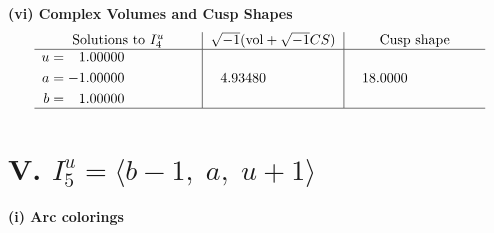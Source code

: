 \documentclass[1p]{elsarticle_modified}
\theoremstyle{definition}
\newcommand{\I}{\sqrt{-1}}
\begin{document}
\newpage\flushleft \textbf{(vi) Complex Volumes and Cusp Shapes}
$$\begin{array}{c|c|c}  
\text{Solutions to }I^u_{4}& \I (\text{vol} + \sqrt{-1}CS) & \text{Cusp shape}\\
 \hline 
\begin{aligned}
u &= \phantom{-}1.00000\phantom{ +0.000000I} \\
a &= -1.00000\phantom{ +0.000000I} \\
b &= \phantom{-}1.00000\phantom{ +0.000000I}\end{aligned}
 & \phantom{-}4.93480\phantom{ +0.000000I} & \phantom{-}18.0000\phantom{ +0.000000I}\\
 \hline 
 \end{array}$$\newpage\newpage\renewcommand{\arraystretch}{1}
\centering \section*{V. $I^u_{5}= \langle b-1,\;a,\;u+1 \rangle$}
\flushleft \textbf{(i) Arc colorings}\\
\end{document}
